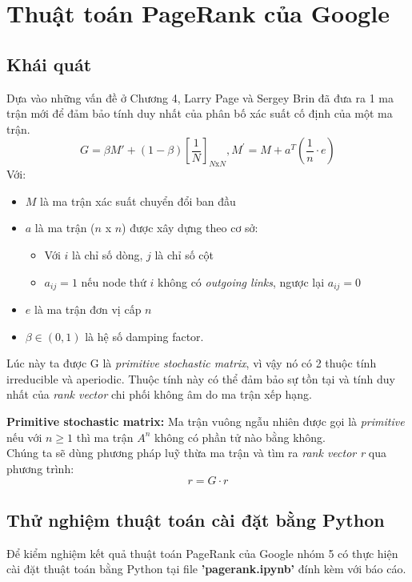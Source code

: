 \chapter{Thuật toán PageRank của Google}
\section{Khái quát}
Dựa vào những vấn đề ở Chương 4, Larry Page và Sergey Brin đã đưa ra 1 ma trận mới để đảm bảo tính duy nhất của phân bố xác suất cố định của một ma trận.
$$ G = \beta M' + (1 - \beta) \left[\dfrac{1}{N}\right]_{N\text{x}N} , M^{'} = M + a^T(\frac{1}{n} \cdot e)$$
Với: 
\begin{itemize}
    \item $M$ là ma trận xác suất chuyển đổi ban đầu
    \item $a$ là ma trận ($n$ x $n$) được xây dựng theo cơ sở:
            \begin{itemize}
                \item Với $i$ là chỉ số dòng, $j$ là chỉ số cột
                \item $a_{ij}=1$ nếu node thứ $i$ không có \emph{outgoing links}, ngược lại $a_{ij}=0$
            \end{itemize} 
    \item $e$ là ma trận đơn vị cấp $n$
    \item $\beta \in (0,1)$ là hệ số damping factor.
\end{itemize}
Lúc này ta được G là \textit{primitive stochastic matrix}, vì vậy nó có 2 thuộc tính irreducible và aperiodic. Thuộc tính này có thể đảm bảo sự tồn tại và tính duy nhất của \textit{rank vector} chi phối không âm do ma trận xếp hạng. 

\textbf{Primitive stochastic matrix: } Ma trận vuông ngẫu nhiên được gọi là \textit{primitive} nếu với $n  \geq 1$ thì ma trận $A^n$ không có phần tử nào bằng không.\cite{Primitive_Stochastic_Matrices}\\
Chúng ta sẽ dùng phương pháp luỹ thừa ma trận và tìm ra \textit{rank vector r} qua phương trình: 
$$r=G\cdot r$$

\section{Thử nghiệm thuật toán cài đặt bằng Python}
Để kiểm nghiệm kết quả thuật toán PageRank của Google nhóm 5 có thực hiện cài đặt thuật toán bằng Python tại file \textbf{'pagerank.ipynb'} đính kèm với báo cáo.
